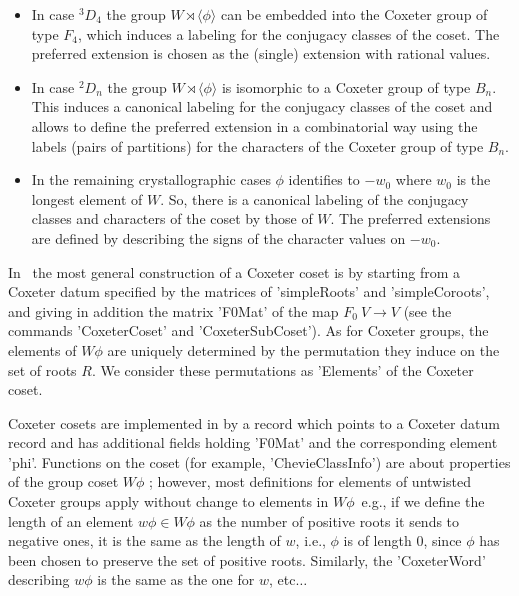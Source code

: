 \begin{itemize}
\item  In  case  $^3D_4$  the  group  $W\rtimes\langle  \phi\rangle$ can be
embedded into the Coxeter group of type $F_4$, which induces a labeling for
the  conjugacy classes of  the coset. The  preferred extension is chosen as
the (single) extension with rational values.

\item In case $^2D_n$ the group $W\rtimes\langle \phi\rangle$ is isomorphic
to a Coxeter group of type $B_n$. This induces a canonical labeling for the
conjugacy classes of the coset and allows to define the preferred extension
in  a  combinatorial  way  using  the  labels (pairs of partitions) for the
characters of the Coxeter group of type $B_n$.

\item  In the remaining crystallographic  cases $\phi$ identifies to $-w_0$
where  $w_0$  is  the  longest  element  of  $W$.  So, there is a canonical
labeling  of the conjugacy classes and characters  of the coset by those of
$W$.  The preferred extensions  are defined by  describing the signs of the
character values on $-w_0$.
\end{itemize}

In  \GAP\ the most general  construction of a Coxeter  coset is by starting
from  a  Coxeter  datum  specified  by  the  matrices  of 'simpleRoots' and
'simpleCoroots',  and  giving  in  addition  the  matrix 'F0Mat' of the map
$F_0\:V\rightarrow V$ (see the commands 'CoxeterCoset' and
'CoxeterSubCoset').  As  for  Coxeter  groups,  the elements of $W\phi$ are
uniquely determined by the permutation they induce on the set of roots $R$.
We consider these permutations as 'Elements' of the Coxeter coset.

Coxeter  cosets are  implemented in  {\GAP} by  a record  which points to a
Coxeter  datum record  and has  additional fields  holding 'F0Mat'  and the
corresponding   element  'phi'.  Functions  on   the  coset  (for  example,
'ChevieClassInfo')  are  about  properties  of  the  group coset $W \phi$ ;
however,  most definitions for  elements of untwisted  Coxeter groups apply
without  change to elements in $W \phi$\:\ e.g., if we define the length of
an  element $w\phi\in W \phi$  as the number of  positive roots it sends to
negative  ones, it  is the  same as  the length  of $w$, i.e., $\phi$ is of
length  $0$, since $\phi$ has  been chosen to preserve  the set of positive
roots.  Similarly, the 'CoxeterWord' describing $w\phi$  is the same as the
one for $w$, etc$\ldots$

